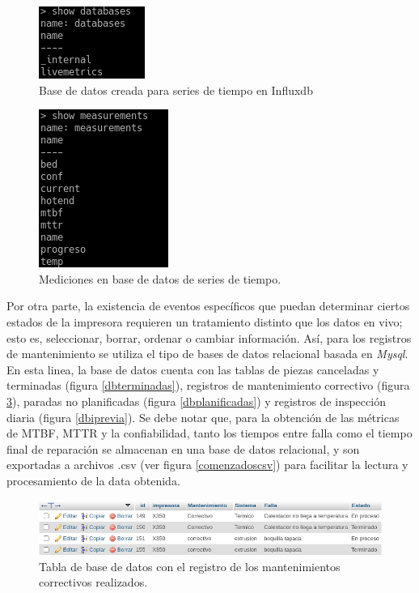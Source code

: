 \begin{figure}[H]
\centering
\includegraphics[scale=1]{images/influxdb.png}
\caption{Base de datos creada para series de tiempo en Influxdb}
\label{influxdb}
\end{figure}

\begin{figure}[H]
\centering
\includegraphics[scale=1]{images/influxmeasurements.png}
\caption{Mediciones en base de datos de series de tiempo.}
\label{measurements}
\end{figure}


Por otra parte, la existencia de eventos específicos que puedan determinar ciertos estados de la impresora requieren un tratamiento distinto que los datos en vivo; esto es, seleccionar, borrar, ordenar o cambiar información. Así, para los registros de mantenimiento se utiliza el tipo de bases de datos relacional basada en \textit{Mysql}. En esta linea, la base de datos cuenta con las tablas de piezas canceladas y terminadas (figura \ref{dbterminadas}), registros de mantenimiento correctivo (figura \ref{dbcorrectivo}), paradas no planificadas (figura \ref{dbplanificadas}) y registros de inspección diaria (figura \ref{dbiprevia}). Se debe notar que, para la obtención de las métricas de MTBF, MTTR y la confiabilidad, tanto los tiempos entre falla como el tiempo final de reparación se almacenan en una base de datos relacional, y son exportadas a archivos .csv (ver figura \ref{comenzadoscsv}) para facilitar la lectura y procesamiento de la data obtenida.

\begin{figure}[H]
\centering
\includegraphics[scale=0.6]{images/dbcorrectivo.png}
\caption{Tabla de base de datos con el registro de los mantenimientos correctivos realizados.}
\label{dbcorrectivo}
\end{figure}

